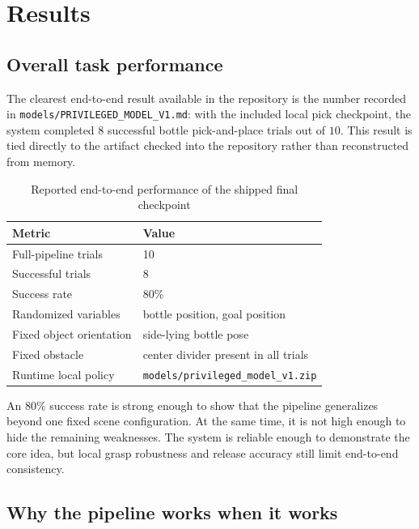 \documentclass[11pt]{article}
\begin{document}
\section{Results}

\subsection{Overall task performance}

The clearest end-to-end result available in the repository is the number recorded in \texttt{models/PRIVILEGED\_MODEL\_V1.md}: with the included local pick checkpoint, the system completed \(8\) successful bottle pick-and-place trials out of \(10\). This result is tied directly to the artifact checked into the repository rather than reconstructed from memory.

\begin{table}[H]
  \caption{Reported end-to-end performance of the shipped final checkpoint}
  \label{tab:overall-results}
  \centering
  \begin{tabular}{ll}
    \toprule
    Metric & Value \\
    \midrule
    Full-pipeline trials & 10 \\
    Successful trials & 8 \\
    Success rate & 80\% \\
    Randomized variables & bottle position, goal position \\
    Fixed object orientation & side-lying bottle pose \\
    Fixed obstacle & center divider present in all trials \\
    Runtime local policy & \texttt{models/privileged\_model\_v1.zip} \\
    \bottomrule
  \end{tabular}
\end{table}

An \(80\%\) success rate is strong enough to show that the pipeline generalizes beyond one fixed scene configuration. At the same time, it is not high enough to hide the remaining weaknesses. The system is reliable enough to demonstrate the core idea, but local grasp robustness and release accuracy still limit end-to-end consistency.

\subsection{Why the pipeline works when it works}
\end{document}
